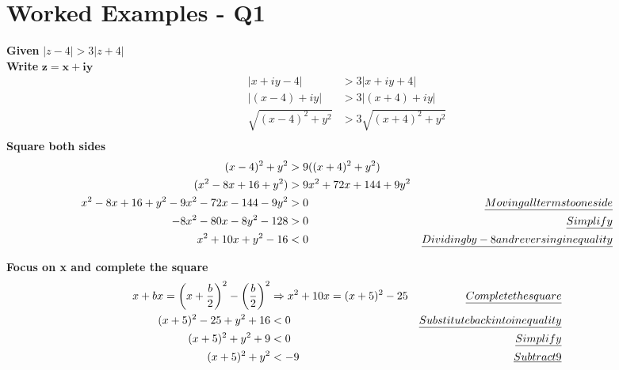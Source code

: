 \documentclass[a4paper, 8pt]{extarticle}
\begin{document}
\pagebreak

\section{Worked Examples - Q1}

\begin{examplebox}[2023 Q1(a)]
    \label{sol:2023Q1a}

    \textbf{Given} $|z - 4| > 3|z+4|$ \\
    \textbf{Write} $\boldsymbol{z = x + iy}$
    \begin{align*}
        | x + iy -4|         & > 3 |x + iy + 4|         \\
        | (x - 4) + iy|      & > 3 |(x + 4) + iy|       \\
        \sqrt{(x-4)^2 + y^2} & > 3 \sqrt{(x+4)^2 + y^2} \\
    \end{align*}
    \textbf{Square both sides}
    \begin{align*}
        (x-4)^2 + y^2                                 & > 9((x+4)^2 + y^2)                                                         \\
        (x^2 - 8x + 16 + y^2)                         & > 9x^2 + 72x + 144 + 9y^2                                                  \\
        x^2 - 8x + 16 + y^2 - 9x^2 - 72x - 144 - 9y^2 & > 0                       & \emph{Moving all terms to one side}            \\
        -8x^2 - 80x - 8y^2 - 128                      & > 0                       & \emph{Simplify }                               \\
        x^2 + 10x + y^2 - 16                          & < 0                       & \emph{Dividing by -8 and reversing inequality} \\
    \end{align*}

    \textbf{Focus on x and complete the square}
    \begin{align*}
        x + bx                   = \left(x + \frac{b}{2}\right)^2 - \left(\frac{b}{2}\right)^2 & \Rightarrow  x^2 + 10x = (x + 5)^2 - 25 & \emph{Complete the square}             \\
        (x+5)^2 - 25 + y^2 + 16                                                                & < 0                                     & \emph{Substitute back into inequality} \\
        (x+5)^2 + y^2 + 9                                                                      & < 0                                     & \emph{Simplify}                        \\
        (x+5)^2 + y^2                                                                          & < -9                                    & \emph{Subtract 9}                      \\
    \end{align*}


\end{examplebox}
\end{document}

